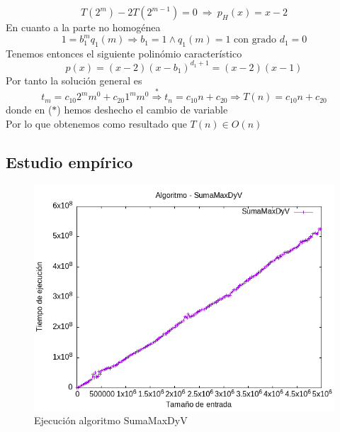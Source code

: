\documentclass[11pt,openany]{book}
\begin{document}
\begin{equation*}
      T(2^m)-2T(2^{m-1})=0 \  \Longrightarrow  \ p_H(x)=x-2
\end{equation*}
En cuanto a la parte no homogénea
\begin{equation*}
      1=b_1^m q_1(m) \Longrightarrow b_1=1 \wedge q_1(m)=1 \text{ con grado } d_1=0
\end{equation*}
Tenemos entonces el siguiente polinómio característico
\begin{equation*}
      p(x)=(x-2)(x-b_1)^{d_1+1}=(x-2)(x-1)
\end{equation*}
Por tanto la solución general es
\begin{equation*}
      t_m=c_{10}2^mm^0+c_{20}1^mm^0  \overset{*}{\Longrightarrow}  t_n=c_{10}n+c_{20} \Longrightarrow T(n)=c_{10}n+c_{20}
\end{equation*}
donde en ($*$) hemos deshecho el cambio de variable \\
Por lo que obtenemos como resultado que $T(n) \in O(n)$
\subsection{Estudio empírico}
\begin{center}
      \begin{figure}[h]
            \centering
            \includegraphics[width=0.7\linewidth]{assets/Img/SumaMaxDyV.png}
            \caption{Ejecución algoritmo SumaMaxDyV}
            \label{fig:SumaMaxDyV}
      \end{figure}
\end{center}
\newpage
\end{document}
